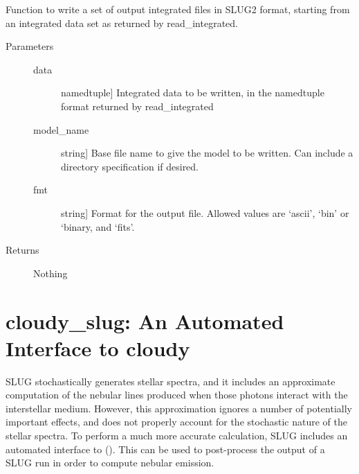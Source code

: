 \documentclass[letterpaper,10pt,english]{sphinxmanual}
\begin{document}
\begin{fulllineitems}
\label{\detokenize{slugpy:slugpy.write_integrated}}
Function to write a set of output integrated files in SLUG2 format,
starting from an integrated data set as returned by
read\_integrated.
\begin{description}
\item[{Parameters}] \leavevmode\begin{description}
\item[{data}] \leavevmode{[}namedtuple{]}
Integrated data to be written, in the namedtuple format returned
by read\_integrated

\item[{model\_name}] \leavevmode{[}string{]}
Base file name to give the model to be written. Can include a
directory specification if desired.

\item[{fmt}] \leavevmode{[}string{]}
Format for the output file. Allowed values are ‘ascii’, ‘bin’
or ‘binary, and ‘fits’.

\end{description}

\item[{Returns}] \leavevmode
Nothing

\end{description}

\end{fulllineitems}



\chapter{cloudy\_slug: An Automated Interface to cloudy}
\label{\detokenize{cloudy:cloudy-slug-an-automated-interface-to-cloudy}}\label{\detokenize{cloudy::doc}}\label{\detokenize{cloudy:sec-cloudy-slug}}
SLUG stochastically generates stellar spectra, and it includes an
approximate computation of the nebular lines produced when those
photons interact with the interstellar medium. However, this
approximation ignores a number of potentially important effects, and
does not properly account for the stochastic nature of the stellar
spectra. To perform a much more accurate calculation, SLUG includes an
automated interface to  (). This can be
used to post-process the output of a SLUG run in order to compute
nebular emission.
\end{document}
